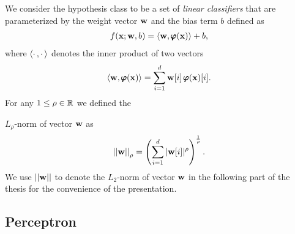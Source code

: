 We consider the hypothesis class to be a set of \textit{linear classifiers} that are parameterized by the weight vector $\mathbf {w}$ and the bias term $b$ defined as
\begin{align}
	f(\mathbf {x};\mathbf {w},b) = \langle \mathbf {w}, \pmb \varphi(\mathbf {x}) \rangle + b, \label{linearclassifier}
\end{align}
where $\langle \cdot\,, \cdot\, \rangle$ denotes the inner product of two vectors
\begin{align*}
	\langle \mathbf {w}, \pmb \varphi(\mathbf {x}) \rangle = \sum_{i=1}^{d}\mathbf {w}[i]\,\pmb \varphi(\mathbf {x})[i].
\end{align*}
For any $1\le\rho\in\mathbb{R}$ we defined the {$L_{\rho}$-norm of vector $\mathbf {w}$ as
\begin{align*}
	\left|\left| \mathbf {w} \right|\right|_{\rho} = \left(\sum_{i=1}^{d}|\mathbf {w}[i]|^{\rho}\right)^{\frac{1}{\rho}}.
\end{align*}
We use $||\mathbf {w}||$ to denote the $L_2$-norm of vector $\mathbf {w}$ in the following part of the thesis for the convenience of the presentation.


%
%
\subsection{Perceptron}\label{sc_perceptron}

}
